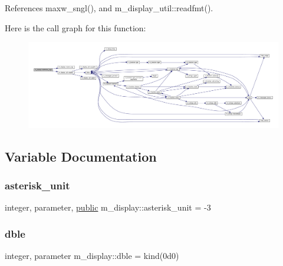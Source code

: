 References maxw\+\_\+sngl(), and m\+\_\+display\+\_\+util\+::readfmt().

Here is the call graph for this function\+:
\nopagebreak
\begin{figure}[H]
\begin{center}
\leavevmode
\includegraphics[width=350pt]{namespacem__display_a3bb36db16c84ea38d1697191adbc027a_cgraph}
\end{center}
\end{figure}


\subsection{Variable Documentation}
\mbox{\label{namespacem__display_a9d76146cf157a888cfc94f84a8ec440f}} 
\subsubsection{\texorpdfstring{asterisk\+\_\+unit}{asterisk\_unit}}
{\footnotesize\ttfamily integer, parameter, \hyperlink{M__stopwatch_83_8txt_a2f74811300c361e53b430611a7d1769f}{public} m\+\_\+display\+::asterisk\+\_\+unit = -\/3}

\mbox{\label{namespacem__display_a46d90b75b6ccef7ccade133e5847e815}} 
\subsubsection{\texorpdfstring{dble}{dble}}
{\footnotesize\ttfamily integer, parameter m\+\_\+display\+::dble = kind(0d0)\hspace{0.3cm}{\ttfamily [private]}}

\mbox{\label{namespacem__display_a73f772e9702cad6f40b78364fde2c7cd}} 
